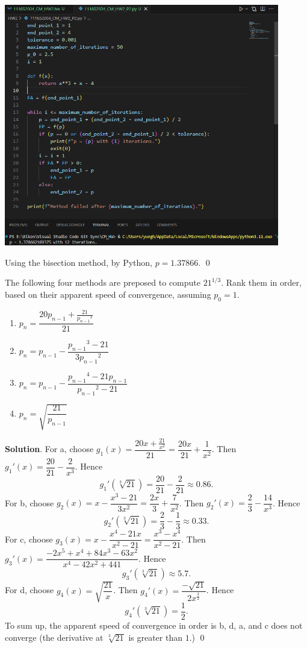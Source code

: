 \documentclass[11pt]{article}
\theoremstyle{break}
\numberwithin{equation}{theorem}
\begin{document}
\begin{center}
    \includegraphics[width=0.9\textwidth]{problem_2_py.png}
\end{center}
Using the bisection method, by Python, $p=1.37866$. \qed


\newpage
\begin{problem}\label{problem 3}
    The following four methods are preposed to compute $21^{1/3}$. Rank them in order, based on their apparent speed of convergence, assuming $p_0=1$.
    \begin{enumerate}
        \item $p_n = \dfrac{20p_{n-1} + \frac{21}{{p_{n-1}}^2}}{21}$
        \item $p_n = p_{n-1} - \dfrac{{p_{n-1}}^3-21}{3{p_{n-1}}^2}$
        \item $p_n = p_{n-1} - \dfrac{{p_{n-1}}^4 - 21p_{n-1}}{{p_{n-1}}^2-21}$
        \item $p_n=\sqrt{\dfrac{21}{p_{n-1}}}$
    \end{enumerate}
\end{problem}
\textbf{Solution}. For a, choose $g_1(x)=\dfrac{20x+\frac{21}{x^2}}{21}=\dfrac{20x}{21}+\dfrac{1}{x^2}$. Then ${g_1}'(x)=\dfrac{20}{21}-\dfrac{2}{x^3}$. Hence $${g_1}'(\sqrt[3]{21})=\dfrac{20}{21}-\dfrac{2}{21}\approx0.86.$$ For b, choose $g_2(x)=x-\dfrac{x^3-21}{3x^2}=\dfrac{2x}{3}+\dfrac{7}{x^2}$. Then ${g_2}'(x)=\dfrac{2}{3}-\dfrac{14}{x^3}$. Hence
$${g_2}'(\sqrt[3]{21})=\dfrac{2}{3}-\dfrac{1}{3}\approx0.33.$$
For c, choose ${g_3}(x)=x-\dfrac{x^4-21x}{x^2-21}=\dfrac{x^3-x^4}{x^2-21}$. Then ${g_3}'(x)=\dfrac{-2x^5+x^4+84x^3-63x^2}{x^4-42x^2+441}$. Hence $${g_3}'(\sqrt[3]{21})\approx5.7.$$ For d, choose ${g_4}(x)=\sqrt{\dfrac{21}{x}}$. Then ${g_4}'(x)=\dfrac{-\sqrt{21}}{2x^{\frac{3}{2}}}$. Hence $${g_4}'(\sqrt[3]{21})=\dfrac{1}{2}.$$ To sum up, the apparent speed of convergence in order is b, d, a, and c does not converge (the derivative at $\sqrt[3]{21}$ is greater than $1$.) \qed
\end{document}
